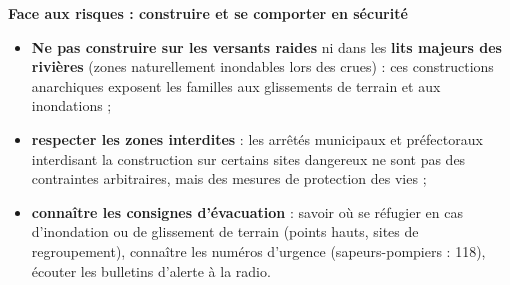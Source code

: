 \documentclass[11pt]{article}
\begin{document}
\textbf{Face aux risques : construire et se comporter en sécurité}\par

\begin{itemize}
\item \textbf{Ne pas construire sur les versants raides} ni dans les \textbf{lits majeurs des rivières} (zones naturellement inondables lors des crues) : ces constructions anarchiques exposent les familles aux glissements de terrain et aux inondations ;
\item \textbf{respecter les zones interdites} : les arrêtés municipaux et préfectoraux interdisant la construction sur certains sites dangereux ne sont pas des contraintes arbitraires, mais des mesures de protection des vies ;
\item \textbf{connaître les consignes d'évacuation} : savoir où se réfugier en cas d'inondation ou de glissement de terrain (points hauts, sites de regroupement), connaître les numéros d'urgence (sapeurs-pompiers : 118), écouter les bulletins d'alerte à la radio.
\end{itemize}
\end{document}
